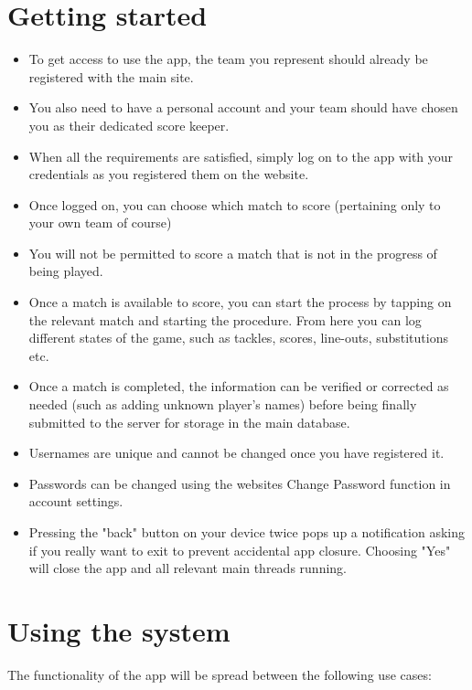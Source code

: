\documentclass[hidelinks,a4paper,12pt]{article}
\begin{document}
\section{Getting started}
	\begin {itemize}
		\item To get access to use the app, the team you represent should already be registered with the main site.
		\item You also need to have a personal account and your team should have chosen you as their dedicated score keeper.
		\item When all the requirements are satisfied, simply log on to the app with your credentials as you registered them on the website.
		\item Once logged on, you can choose which match to score (pertaining only to your own team of course)
		\item You will not be permitted to score a match that is not in the progress of being played.
		\item Once a match is available to score, you can start the process by tapping on the relevant match and starting the procedure. From here you can log different states of the game, such as tackles, scores, line-outs, substitutions etc.
		\item Once a match is completed, the information can be verified or corrected as needed (such as adding unknown player's names) before being finally submitted to the server for storage in the main database.
		\item Usernames are unique and cannot be changed once you have registered it.
		\item Passwords can be changed using the websites Change Password function in account settings.
		\item Pressing the "back" button on your device twice pops up a notification asking if you really want to exit to prevent accidental app closure. Choosing "Yes" will close the app and all relevant main threads running.
	\end{itemize}
	
\newpage

\section{Using the system}
The functionality of the app will be spread between the following use cases:
\end{document}
